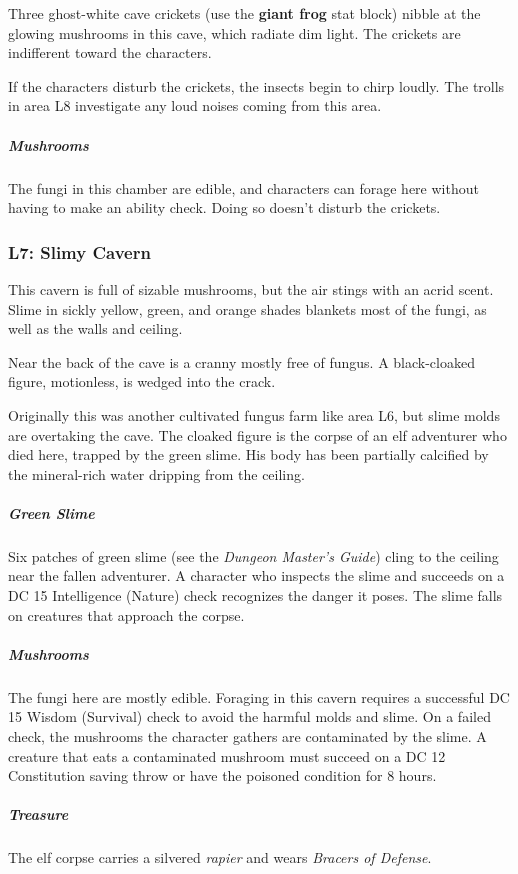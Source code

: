 \documentclass[10pt,a4paper,twoside,bg=print,twocolumn,openany,nodeprecatedcode]{dndbook}
\begin{document}
Three ghost-white cave crickets (use the \textbf{giant frog} stat block) nibble at the glowing mushrooms in this cave, which radiate dim light. The crickets are indifferent toward the characters.

If the characters disturb the crickets, the insects begin to chirp loudly. The trolls in area L8 investigate any loud noises coming from this area.

\subparagraph{Mushrooms}
The fungi in this chamber are edible, and characters can forage here without having to make an ability check. Doing so doesn't disturb the crickets.

\subsubsection{L7: Slimy Cavern}
\begin{DndReadAloud}{}
This cavern is full of sizable mushrooms, but the air stings with an acrid scent. Slime in sickly yellow, green, and orange shades blankets most of the fungi, as well as the walls and ceiling.

Near the back of the cave is a cranny mostly free of fungus. A black-cloaked figure, motionless, is wedged into the crack.

\end{DndReadAloud}

Originally this was another cultivated fungus farm like area L6, but slime molds are overtaking the cave. The cloaked figure is the corpse of an elf adventurer who died here, trapped by the green slime. His body has been partially calcified by the mineral-rich water dripping from the ceiling.

\subparagraph{Green Slime}
Six patches of green slime (see the \textit{Dungeon Master's Guide}) cling to the ceiling near the fallen adventurer. A character who inspects the slime and succeeds on a DC 15 Intelligence (Nature) check recognizes the danger it poses. The slime falls on creatures that approach the corpse.

\subparagraph{Mushrooms}
The fungi here are mostly edible. Foraging in this cavern requires a successful DC 15 Wisdom (Survival) check to avoid the harmful molds and slime. On a failed check, the mushrooms the character gathers are contaminated by the slime. A creature that eats a contaminated mushroom must succeed on a DC 12 Constitution saving throw or have the poisoned condition for 8 hours.

\subparagraph{Treasure}
The elf corpse carries a silvered \textit{rapier} and wears \textit{Bracers of Defense}.
\end{document}
